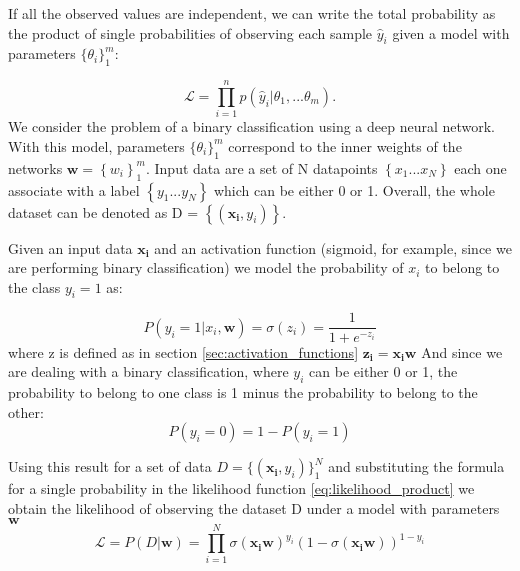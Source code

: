 \documentclass[11pt]{report}
\begin{document}
If all the observed values are independent, we can write the total probability as the product of single probabilities of observing each sample $\hat y_i$ given a model with parameters $\{\theta_i \}_1 ^m$:

\begin{equation}\label{eq:likelihood_product}
\mathcal{L} =\prod_{i=1}^n p(\hat y_i|\theta_1, ...\theta_m).
\end{equation}
We consider the problem of a binary classification using a deep neural network.
With this model, parameters $\{\theta_i \}_1 ^m$ correspond to the inner weights of the networks $\mathbf{w} = \left\{w_i \right\}_1^m$.
Input data are a set of N datapoints $\left\{ x_1 ... x_N\right\}$ each one associate with a label  $\left\{ y_1 ... y_N\right\}$ which can be either 0 or 1.
Overall, the whole dataset can be denoted as D = $\left\{ (\mathbf{x_i}, y_i)\right\}$.

Given an input data $\mathbf{x_i}$  and an activation function (sigmoid, for example, since we are performing binary classification)
we model the probability of $x_i$ to belong to the class $y_i = 1$ as:

\begin{equation}
 P(y_i = 1 | x_i, \mathbf{w}) = \sigma(z_i) = \frac{1}{1+e^{-z_i}}
\end{equation}
where z is defined as in section \ref{sec:activation_functions} $\mathbf{z_i} = \mathbf{x_i}\mathbf{w}$
And since we are dealing with a binary classification, where $y_i$ can be either 0 or 1, the probability to belong to one class is 1 minus the probability to belong to the other:
\begin{equation}
P(y_i = 0) = 1 - P(y_i = 1)
\end{equation}

Using this result for a set of data $D = \{ (\mathbf{x_i}, y_i)\}_1 ^N$ and substituting the formula for a single probability in the likelihood function \ref{eq:likelihood_product} we obtain the likelihood of observing the dataset D under a model with parameters $\mathbf{w}$
\begin{equation}\label{eq:like_no_log}
\mathcal{L} = P(D|\mathbf{w}) = \prod_{i=1}^N \sigma(\mathbf{x_i w})^{y_i} (1-\sigma(\mathbf{x_i w}))^{1-y_i}
\end{equation}
\end{document}
